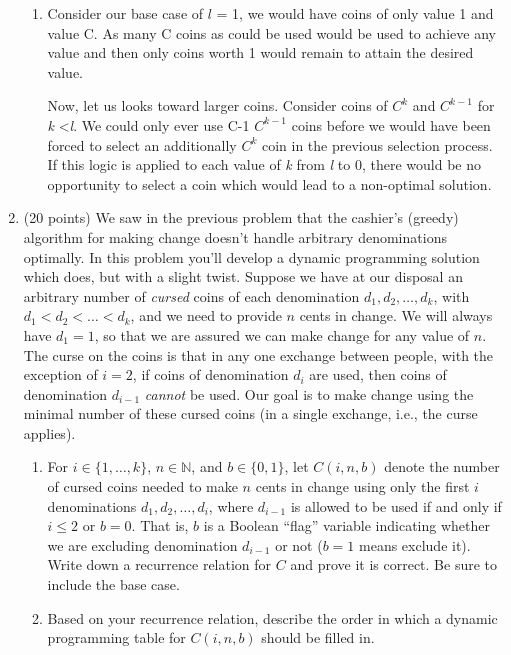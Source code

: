 \documentclass[12pt]{article}
\begin{document}
\begin{enumerate}
\begin{enumerate}
\item Consider our base case of $\textit{l}$ = 1, we would have coins of only value 1 and value C. As many C coins as could be used would be used to achieve any value and then only coins worth 1 would remain to attain the desired value.

Now, let us looks toward larger coins. Consider coins of $C^{k}$ and $C^{k-1}$ for \textit{k} \textless \textit{l}. We could only ever use C-1 $C^{k-1}$ coins before we would have been forced to select an additionally $C^{k}$ coin in the previous selection process. If this logic is applied to each value of \textit{k} from \textit{l} to 0, there would be no opportunity to select a coin which would lead to a non-optimal solution.
\end{enumerate}

    \item (20 points) We saw in the previous problem that the cashier's (greedy) algorithm for making change doesn't handle arbitrary denominations optimally. In this problem you'll develop a dynamic programming solution which does, but with a slight twist. Suppose we have at our disposal an arbitrary number of \emph{cursed} coins of each denomination $d_1, d_2, \dotsc, d_k$, with $d_1 < d_2 < \dotsc < d_k$, and we need to provide $n$ cents in change. We will always have $d_1=1$, so that we are assured we can make change for any value of $n$. The curse on the coins is that in any one exchange between people, with the exception of $i=2$, if coins of denomination $d_i$ are used, then coins of denomination $d_{i-1}$ \emph{cannot} be used. Our goal is to make change using the minimal number of these cursed coins (in a single exchange, i.e., the curse applies).

    \begin{enumerate}
    	\item For $i \in \{1,\dotsc,k\}$, $n \in \mathbb{N}$, and $b \in \{0,1\}$, let $C(i,n,b)$ denote the number of cursed coins needed to make $n$ cents in change using only the first $i$ denominations $d_1, d_2, \dotsc, d_i$, where $d_{i-1}$ is allowed to be used if and only if $i \leq 2$ or $b=0$. That is, $b$ is a Boolean ``flag'' variable indicating whether we are excluding denomination $d_{i-1}$ or not ($b=1$ means exclude it). 	
    	Write down a recurrence relation for $C$ and prove it is correct. Be sure to include the base case.
    	\item Based on your recurrence relation, describe the order in which a dynamic programming table for $C(i,n,b)$ should be filled in.
    	

\end{enumerate}
\end{enumerate}
\end{document}
